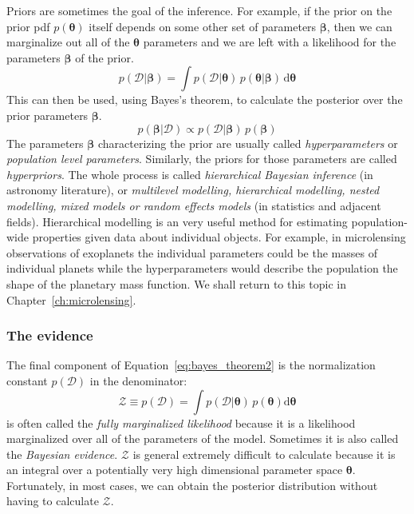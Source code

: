 \documentclass[12pt]{report}
\newcommand{\ud}{\,\mathrm{d}}
\renewcommand{\vec}[1]{\boldsymbol{\mathbf{#1}}}
\begin{document}
Priors are sometimes the goal of the inference. For example, if the prior on
the prior pdf $p(\vec{\theta})$ itself depends on some other set of parameters
$\vec{\beta}$, then we can marginalize out all of the $\vec{\theta}$ parameters
and we are left with a likelihood for the parameters $\vec{\beta}$ of the
prior.
\begin{equation}
    p(\mathcal{D}\lvert\vec{\beta})=\int p(\mathcal{D}\lvert\vec{\theta})\,p(\vec{\theta}\lvert
    \vec{\beta})\ud \vec{\theta}
\end{equation}
This can then be used, using Bayes's theorem, to calculate the posterior
over the prior parameters $\bm\beta$.
\begin{equation}
    p(\bm\beta\lvert\mathcal{D})\propto p(\mathcal{D}\lvert\vec{\beta})
    \,p(\bm\beta)
\end{equation}
The parameters $\bm\beta$ characterizing the prior are usually called
\emph{hyperparameters} or \emph{population level parameters}. Similarly, the priors
for those parameters are called \emph{hyperpriors}.
The whole process is called \emph{hierarchical Bayesian inference}
(in astronomy literature),  or \emph{multilevel modelling, hierarchical modelling,
    nested modelling, mixed models or random effects models}
(in statistics and adjacent fields).
Hierarchical modelling is an very useful method for estimating
population-wide properties given data about individual objects. For example,
in microlensing observations of exoplanets the individual parameters could be the
masses of individual planets while the hyperparameters would describe the
population the shape of the planetary mass function. We shall return to this topic
in Chapter~\ref{ch:microlensing}.

\subsubsection{The evidence}
The final component of Equation~\ref{eq:bayes_theorem2} is the normalization
constant $ p(\mathcal{D})$ in the denominator:
\begin{equation}
    \mathcal{Z}\equiv p(\mathcal{D})=\int p(\mathcal D\lvert\boldsymbol\theta)\,p(\boldsymbol\theta)\textrm{d}\boldsymbol\theta
    \label{eq:evidence}
\end{equation}
is often called the \emph{fully marginalized likelihood} because
it is a likelihood marginalized over all of the parameters of the model.
Sometimes
it is also called the \emph{Bayesian evidence}.
$\mathcal{Z}$ is general extremely difficult to calculate because it is an
integral over a potentially very high dimensional parameter space $\vec{\theta}$.
Fortunately, in most cases, we can obtain the posterior distribution without having
to calculate $\mathcal{Z}$.
\end{document}
